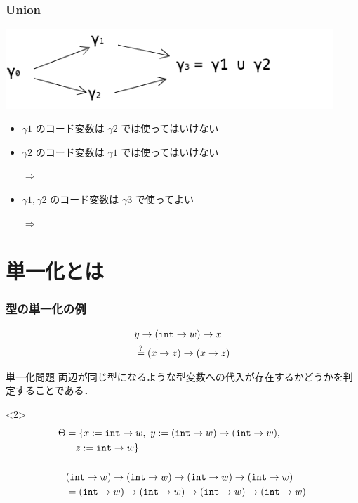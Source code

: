 \begin{frame}
  \frametitle{Union}
  \flushleft
  \includegraphics[clip,height=3cm]{./img/ecgraph.png}
  \begin{itemize}
  \item $\gamma1$ のコード変数は $\gamma2$ では使ってはいけない
  \item $\gamma2$ のコード変数は $\gamma1$ では使ってはいけない
  \item [$\Rightarrow$] 
  \end{itemize}

  \begin{itemize}
  \item $\gamma1, \gamma2$ のコード変数は $\gamma3$ で使ってよい
  \item [$\Rightarrow$]  %
  \end{itemize}
\end{frame}

\section{単一化とは}

\begin{frame}
  \frametitle{型の単一化の例}
  \begin{align*}
    &y \to (\mbox{\texttt{int}} \to w) \to x \\
    &\stackrel?= (x \to z) \to (x \to z)
  \end{align*}

  \begin{exampleblock}{単一化問題}
    両辺が同じ型になるような型変数への代入が存在するかどうかを判定することである．
  \end{exampleblock}

  \vspace{-1zh}
  \begin{visibleenv}<2>
    \begin{align*}
      \Theta &= \{x := \mbox{\texttt{int}} \to w,~ y := (\mbox{\texttt{int}} \to w) \to (\mbox{\texttt{int}} \to w),~\\
             &~~~z := \mbox{\texttt{int}} \to w \} \\
      \\
             &  (\mbox{\texttt{int}} \to w) \to (\mbox{\texttt{int}} \to w) \to (\mbox{\texttt{int}} \to w) \to (\mbox{\texttt{int}} \to w) \\
             &= (\mbox{\texttt{int}} \to w) \to (\mbox{\texttt{int}} \to w ) \to (\mbox{\texttt{int}} \to w ) \to (\mbox{\texttt{int}} \to w )
    \end{align*}
  \end{visibleenv}
\end{frame}

